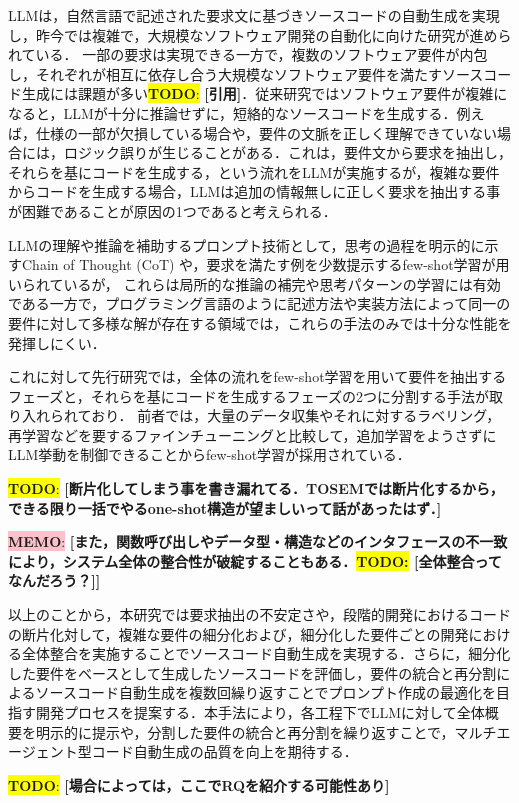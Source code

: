 \documentclass[submit,techrep,noauthor]{ipsj}
\newcommand{\todo}[1]{\colorbox{yellow}{{\bf TODO}:}{\color{red} {\textbf{[#1]}}}}
\newcommand{\memo}[1]{\colorbox{pink}{{\bf MEMO}:}{\color{black} {\textbf{[#1]}}}}
\begin{document}
LLMは，自然言語で記述された要求文に基づきソースコードの自動生成を実現し，昨今では複雑で，大規模なソフトウェア開発の自動化に向けた研究が進められている．\cite{LLM_CodeGeneration} 一部の要求は実現できる一方で，複数のソフトウェア要件が内包し，それぞれが相互に依存し合う大規模なソフトウェア要件を満たすソースコード生成には課題が多い\todo{引用}．従来研究ではソフトウェア要件が複雑になると，LLMが十分に推論せずに，短絡的なソースコードを生成する．例えば，仕様の一部が欠損している場合や，要件の文脈を正しく理解できていない場合には，ロジック誤りが生じることがある．これは，要件文から要求を抽出し，それらを基にコードを生成する，という流れをLLMが実施するが，複雑な要件からコードを生成する場合，LLMは追加の情報無しに正しく要求を抽出する事が困難であることが原因の1つであると考えられる．

LLMの理解や推論を補助するプロンプト技術として，思考の過程を明示的に示すChain of Thought (CoT) や，要求を満たす例を少数提示するfew-shot学習が用いられているが，\cite{LLM_fewshot} これらは局所的な推論の補完や思考パターンの学習には有効である一方で，プログラミング言語のように記述方法や実装方法によって同一の要件に対して多様な解が存在する領域では，これらの手法のみでは十分な性能を発揮しにくい．

これに対して先行研究では，全体の流れをfew-shot学習を用いて要件を抽出するフェーズと，それらを基にコードを生成するフェーズの2つに分割する手法が取り入れられており．\cite{tosem} 前者では，大量のデータ収集やそれに対するラベリング，再学習などを要するファインチューニングと比較して，追加学習をようさずにLLM挙動を制御できることからfew-shot学習が採用されている．

\todo{断片化してしまう事を書き漏れてる．TOSEMでは断片化するから，できる限り一括でやるone-shot構造が望ましいって話があったはず．}

\memo{また，関数呼び出しやデータ型・構造などのインタフェースの不一致により，システム全体の整合性が破綻することもある．\todo{全体整合ってなんだろう？}}

以上のことから，本研究では要求抽出の不安定さや，段階的開発におけるコードの断片化対して，複雑な要件の細分化および，細分化した要件ごとの開発における全体整合を実施することでソースコード自動生成を実現する．さらに，細分化した要件をベースとして生成したソースコードを評価し，要件の統合と再分割によるソースコード自動生成を複数回繰り返すことでプロンプト作成の最適化を目指す開発プロセスを提案する．本手法により，各工程下でLLMに対して全体概要を明示的に提示や，分割した要件の統合と再分割を繰り返すことで，マルチエージェント型コード自動生成の品質を向上を期待する．

\todo{場合によっては，ここでRQを紹介する可能性あり}
\end{document}
